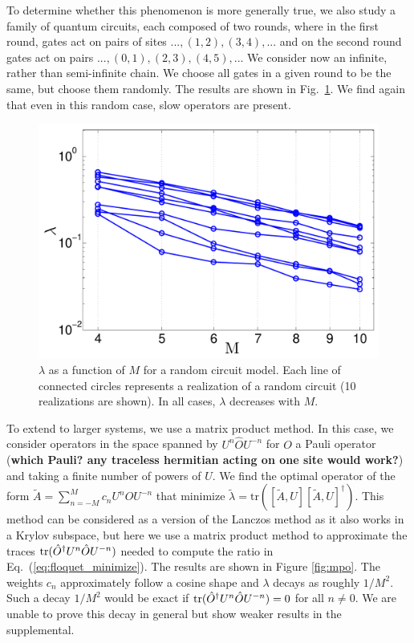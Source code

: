 \documentclass[twocolumn,superscriptaddress, prb]{revtex4-1}
\begin{document}
To determine whether this phenomenon is more generally true, we also study a family of quantum circuits, each composed of two rounds, where in the first round, gates act on pairs of sites $...,(1,2),(3,4),...$ and on the second round gates act on pairs $...,(0,1),(2,3),(4,5),...$  We consider now an infinite, rather than semi-infinite chain.  We choose all gates in a given round to be the same, but choose them randomly.  The results are shown in Fig.~\ref{fig:lz}.  We find again that even in this random case, slow operators are present. %

\begin{figure}
\includegraphics[width=1.0\linewidth]{random_circuit_no_inset.pdf}
\centering
\caption{$\lambda$ as a function of $M$ for a random circuit model. Each line of connected circles represents a realization of a random circuit (10 realizations are shown). In all cases, $\lambda$ decreases with $M$.} %
\label{fig:lz}
\end{figure}

To extend to larger systems, we use a matrix product method.  In this case, we consider operators in the space spanned by $U^n \hat{O} U^{-n}$ for $O$ a
Pauli operator ({\bf which Pauli? any traceless hermitian acting on one site would work?}) 
and taking a finite number of powers of $U$.  We find the optimal operator of the form $\tilde{A}=\sum_{n=-M}^M c_n U^n \hat{O} U^{-n}$ 
that minimize $\tilde{\lambda} = \mathrm{tr}([\tilde{A},U][\tilde{A},U]^\dag)$.  
This method can be considered as a version of the Lanczos method as it also works in a Krylov subspace, but here we use a matrix product method to approximate the traces ${\rm tr}(\hat{O}^\dagger U^n \hat{O} U^{-n})$ needed to compute the ratio in Eq.~(\ref{eq:floquet_minimize}).
The results are shown in Figure \ref{fig:mpo}.
The weights $c_n$ approximately follow a cosine shape and $\lambda$ decays as roughly $1/M^2$.  
Such a decay $1/M^2$ would be exact if
${\rm tr}(\hat{O}^\dagger U^n \hat{O} U^{-n})=0$ for all $n \neq 0$.
We are unable to prove this decay in general but show weaker results in the supplemental.
\end{document}
